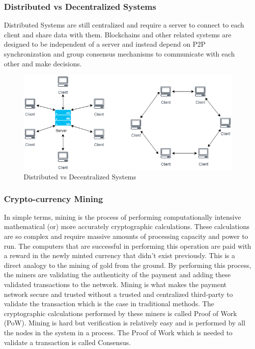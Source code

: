 \documentclass[11pt,openright]{report}
\begin{document}
\subsubsection{Distributed vs Decentralized Systems}
Distributed Systems \cite{7925332} are still centralized and require a server to connect to each client and share data with them. Blockchains and other related systems are designed to be independent of a server and instead depend on P2P synchronization and group consensus mechanisms to communicate with each other and make decisions.
\newpage
\hfill\\
\begin{figure}[!htbp]
    \centering
    \includegraphics[scale=0.5]{images/Decentralized.png}
    \caption{Distributed vs Decentralized Systems}
    \label{fig:Decentralized_Systems}
\end{figure}
\newline
\newline
\subsubsection{Crypto-currency Mining}\label{crypto-mining}
In simple terms, mining is the process of performing computationally intensive mathematical (or) more accurately cryptographic calculations. These calculations are so complex and require massive amounts of processing capacity and power to run. The computers that are successful in performing this operation are paid with a reward in the newly minted currency that didn't exist previously. This is a direct analogy to the mining of gold from the ground. By performing this process, the miners are validating the authenticity of the payment and adding these validated transactions to the network. Mining is what makes the payment network secure and trusted without a trusted and centralized third-party to validate the transaction which is the case in traditional methods. The cryptographic calculations performed by these miners is called Proof of Work (PoW). Mining is hard but verification is relatively easy and is performed by all the nodes in the system in a process. The Proof of Work which is needed to validate a transaction is called Consensus.
\end{document}
